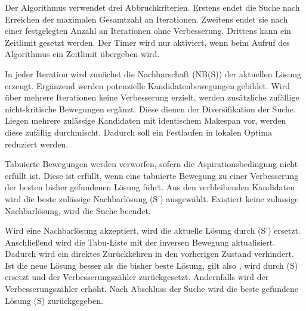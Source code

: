 Der Algorithmus verwendet drei Abbruchkriterien. Erstens endet die Suche nach Erreichen der maximalen Gesamtzahl an Iterationen. Zweitens endet sie nach einer festgelegten Anzahl an Iterationen ohne Verbesserung. Drittens kann ein Zeitlimit gesetzt werden. Der Timer wird nur aktiviert, wenn beim Aufruf des Algorithmus ein Zeitlimit übergeben wird.
 
 In jeder Iteration wird zunächst die Nachbarschaft (NB(S)) der aktuellen Lösung erzeugt. Ergänzend werden potenzielle Kandidatenbewegungen gebildet. Wird über mehrere Iterationen keine Verbesserung erzielt, werden zusätzliche zufällige nicht-kritische Bewegungen ergänzt. Diese dienen der Diversifikation der Suche. Liegen mehrere zulässige Kandidaten mit identischem Makespan vor, werden diese zufällig durchmischt. Dadurch soll ein Festlaufen in lokalen Optima reduziert werden.
 
 Tabuierte Bewegungen werden verworfen, sofern die Aspirationsbedingung nicht erfüllt ist. Diese ist erfüllt, wenn eine tabuierte Bewegung zu einer Verbesserung der besten bisher gefundenen Lösung führt. Aus den verbleibenden Kandidaten wird die beste zulässige Nachbarlösung (S') ausgewählt. Existiert keine zulässige Nachbarlösung, wird die Suche beendet.
 
 Wird eine Nachbarlösung akzeptiert, wird die aktuelle Lösung durch (S') ersetzt. Anschließend wird die Tabu-Liste mit der inversen Bewegung aktualisiert. Dadurch wird ein direktes Zurückkehren in den vorherigen Zustand verhindert. Ist die neue Lösung besser als die bisher beste Lösung, gilt also , wird  durch (S) ersetzt und der Verbesserungszähler zurückgesetzt. Andernfalls wird der Verbesserungszähler erhöht. Nach Abschluss der Suche wird die beste gefundene Lösung (S) zurückgegeben.

